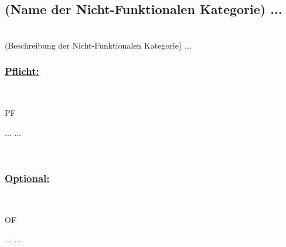 %
%

\subsection{(Name der Nicht-Funktionalen Kategorie) ...}

~\\
(Beschreibung der Nicht-Funktionalen Kategorie) ...
\\

%
%
\subsubsection*{\underline{Pflicht:}}~\\

\begin{reqs}{PF} 

	\req[ 1] ...
 	\req[10] ...
	
\end{reqs}

~\\


%
%
\subsubsection*{\underline{Optional:}}~\\


\begin{reqs}{OF}

	\req[ 11] ...
 	\req[100] ...
	
\end{reqs}

~\\